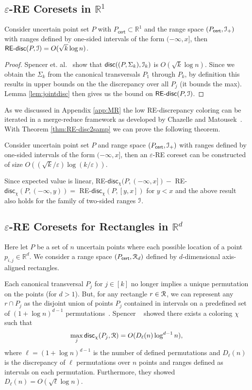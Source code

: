 \documentclass[11pt]{myclass}
\newcommand{\eps}{\varepsilon}
\newcommand{\Eu}[1]{\ensuremath{\EuScript{#1}}}
\newcommand{\bl}[1]{\ensuremath{\mathbb{#1}}}
\newcommand{\disc}{\textsf{disc}}
\newcommand{\cert}{\textsf{cert}}
\newcommand{\RE}{\textsf{RE}\xspace}
\newcommand{\REd}{\RE\text{-}\disc}
\begin{document}
\subsection{$\eps$-\RE Coresets in $\bl{R}^1$}
\label{subsec:1dre}
\begin{lemma}\label{lowdis}
Consider uncertain point set $P$ with $P_\cert \subset \bl{R}^1$ and the range space $(P_\cert, \Eu{I}_+)$ with ranges defined by one-sided intervals of the form $(-\infty, x]$, then $\REd(P,\Eu{I}) = O(\sqrt{k} \log n)$.
 \end{lemma}
\begin{proof}
 Spencer et. al.~\cite{spencer} show that $\disc((P, \Sigma_k),\Eu{I}_k)$ is $O(\sqrt{k} \log n)$.   Since we obtain the $\Sigma_k$ from the canonical transversals $P_1$ through $P_k$, by definition this results in upper bounds on the the discrepancy over all $P_j$ (it bounds the max). Lemma \ref{lem:jointdisc} then gives us the bound on $\REd(P,\Eu{I})$.
\end{proof} 

As we discussed in Appendix \ref{app:MR} the low \RE-discrepancy coloring can be iterated in a merge-reduce framework as developed by Chazelle and Matousek~\cite{CM96}.   With Theorem \ref{thm:RE-disc2samp} we can prove the following theorem.  

\begin{theorem}\label{thm:1deps-RE}
Consider uncertain point set $P$ and range space $(P_\cert, \Eu{I}_+)$ with ranges defined by one-sided intervals of the form $(-\infty, x]$, 
then an $\eps$-\RE coreset can be constructed of size $O((\sqrt{k}/\eps) \log (k/\eps))$.
 \end{theorem}

Since expected value is linear, \RE-$\disc_\chi(P,(-\infty,x]) -$ \RE-$\disc_\chi(P,(-\infty,y)) = $ \RE-$\disc_\chi(P,[y,x])$ for $y<x$ and the above result also holds for the family of two-sided ranges $\Eu{I}$.  



\subsection{$\eps$-\RE Coresets for Rectangles in $\bl{R}^d$}
\label{subsec:highdre}
Here let $P$ be a set of $n$ uncertain points where each possible location of a point $p_{i,j} \in \bl{R}^d$.  We consider a range space $(P_\cert, \Eu{R}_d)$ defined by $d$-dimensional axis-aligned rectangles.  

Each canonical transversal $P_j$ for $j \in [k]$ no longer implies a unique permutation on the points (for $d>1$).  But, for any rectangle $r \in \Eu{R}$, we can represent any $r \cap P_j$  as the disjoint union of points $P_j$ contained in intervals on a predefined set of ${(1 + \log n )}^{d-1}$ permutations~\cite{bohus}. 
Spencer \etal~\cite{spencer} showed there exists a coloring $\chi$ such that 
\[
\max_j \disc_{\chi}(P_j, \Eu{R}) = O(D_\ell(n) \log ^{d-1} n),
\] 
where $\ell ={(1 + \log n )}^{d-1}$ is the number of defined permutations and $D_\ell(n)$ is the discrepancy of $\ell$ permutations over $n$ points and ranges defined as intervals on each permutation.  Furthermore, they showed $D_\ell(n) = O(\sqrt{\ell} \log n)$.  
\end{document}
